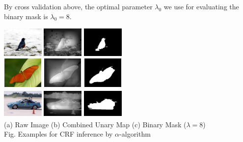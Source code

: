 \documentclass[10pt,twocolumn,letterpaper]{article}
\begin{document}
By cross validation above, the optimal parameter $\lambda_0$ we use for evaluating the binary mask is $\lambda_0 = 8$.
\begin{center}
    \includegraphics[width=0.8in,height=0.6in]{./Figures/CRFinference/5_159_159364.jpg}
    \includegraphics[width=0.8in,height=0.6in]{./Figures/CRFinference/5_159_159364_3.jpg}
    \includegraphics[width=0.8in,height=0.6in]{./Figures/CRFinference/5_159_159364_2.jpg} \\
    \includegraphics[width=0.8in,height=0.6in]{./Figures/CRFinference/5_159_159649.jpg}
    \includegraphics[width=0.8in,height=0.6in]{./Figures/CRFinference/5_159_159649_3.jpg}
    \includegraphics[width=0.8in,height=0.6in]{./Figures/CRFinference/5_159_159649_2.jpg} \\
    \includegraphics[width=0.8in,height=0.6in]{./Figures/CRFinference/5_162_162349.jpg}
    \includegraphics[width=0.8in,height=0.6in]{./Figures/CRFinference/5_162_162349_3.jpg}
    \includegraphics[width=0.8in,height=0.6in]{./Figures/CRFinference/5_162_162349_2.jpg} \\
    \footnotesize  (a) Raw Image (b) Combined Unary Map  (c) Binary Mask ($\lambda=8$)\\
     Fig. Examples for CRF inference by $\alpha$-algorithm
\end{center}
\end{document}
